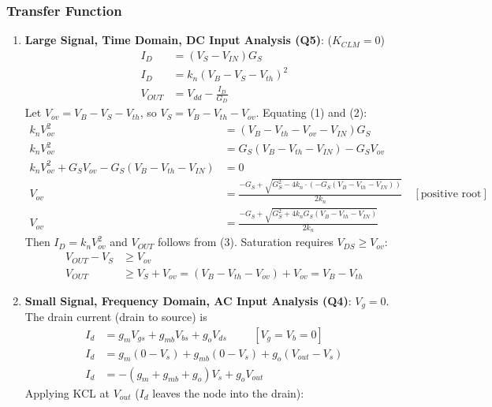 \subsubsection{Transfer Function}
\begin{enumerate}
  \item \textbf{Large Signal, Time Domain, DC Input Analysis (Q5)}: (\(K_{CLM} = 0\))
    \begin{align*}
      I_D &= (V_S - V_{IN}) G_S \tag{1} \\
      I_D &= k_n (V_B - V_S - V_{th})^2 \tag{2} \\
      V_{OUT} &= V_{dd} - \frac{I_D}{G_D} \tag{3}
    \end{align*}
    Let \(V_{ov} = V_B - V_S - V_{th}\), so \(V_S = V_B - V_{th} - V_{ov}\). Equating
    (1) and (2):
    \begin{align*}
      k_n V_{ov}^2 &= (V_B - V_{th} - V_{ov} - V_{IN}) G_S \\
      k_n V_{ov}^2 &= G_S (V_B - V_{th} - V_{IN}) - G_S V_{ov} \\
      k_n V_{ov}^2 + G_S V_{ov} - G_S (V_B - V_{th} - V_{IN}) &= 0 \\
      V_{ov} &= \frac{-G_S + \sqrt{G_S^2 - 4 k_n \cdot \left(-G_S (V_B - V_{th} - V_{IN})\right)}}{2 k_n} \quad [\text{positive root}] \\
      V_{ov} &= \frac{-G_S + \sqrt{G_S^2 + 4 k_n G_S (V_B - V_{th} - V_{IN})}}{2 k_n}
    \end{align*}
    Then \(I_D = k_n V_{ov}^2\) and \(V_{OUT}\) follows from (3).
    Saturation requires \(V_{DS} \geq V_{ov}\):
    \begin{align*}
      V_{OUT} - V_S &\geq V_{ov} \\
      V_{OUT} &\geq V_S + V_{ov} = (V_B - V_{th} - V_{ov}) + V_{ov} = V_B - V_{th}
    \end{align*}
  \item \textbf{Small Signal, Frequency Domain, AC Input Analysis (Q4)}: \(V_g = 0\). The drain current
    (drain to source) is
    \begin{align*}
      I_d &= g_m V_{gs} + g_{mb} V_{bs} + g_o V_{ds} \hspace{1cm} [V_g = V_b = 0] \\
      I_d &= g_m(0 - V_s) + g_{mb}(0 - V_s) + g_o(V_{out} - V_s) \\
      I_d &= -(g_m + g_{mb} + g_o) V_s + g_o V_{out} \tag{4}
    \end{align*}
    Applying KCL at \(V_{out}\) (\(I_d\) leaves the node into the drain):

\end{enumerate}
